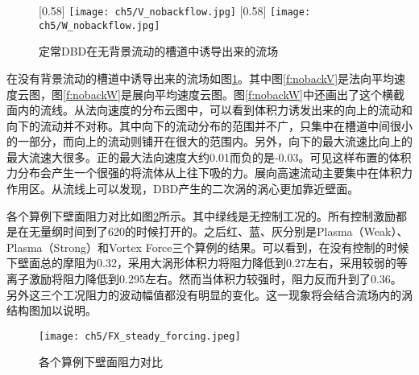 \begin{figure}[htb]
  \centering
  [0.58\textwidth]%
    {\texttt{[image: ch5/V\_nobackflow.jpg]}}%
  [0.58\textwidth]
    {\texttt{[image: ch5/W\_nobackflow.jpg]}}%
  \caption{定常DBD在无背景流动的槽道中诱导出来的流场}\label{f:nobackflow}
\end{figure}
在没有背景流动的槽道中诱导出来的流场如图\ref{f:nobackflow}。其中图\ref{f:nobackV}是法向平均速度云图，图\ref{f:nobackW}是展向平均速度云图。图\ref{f:nobackW}中还画出了这个横截面内的流线。从法向速度的分布云图中，可以看到体积力诱发出来的向上的流动和向下的流动并不对称。其中向下的流动分布的范围并不广，只集中在槽道中间很小的一部分，而向上的流动则铺开在很大的范围内。另外，向下的最大流速比向上的最大流速大很多。正的最大法向速度大约0.01而负的是-0.03。可见这样布置的体积力分布会产生一个很强的将流体从上往下吸的力。展向高速流动主要集中在体积力作用区。从流线上可以发现，DBD产生的二次涡的涡心更加靠近壁面。

各个算例下壁面阻力对比如图\ref{f:darg_steady}所示。其中绿线是无控制工况的。所有控制激励都是在无量纲时间到了620的时候打开的。之后红、蓝、灰分别是Plasma（Weak）、Plasma（Strong）和Vortex Force三个算例的结果。可以看到，在没有控制的时候下壁面总的摩阻为0.32，采用大涡形体积力将阻力降低到0.27左右，采用较弱的等离子激励将阻力降低到0.295左右。然而当体积力较强时，阻力反而升到了0.36。另外这三个工况阻力的波动幅值都没有明显的变化。这一现象将会结合流场内的涡结构图加以说明。
\begin{figure}
  \centering
  \texttt{[image: ch5/FX\_steady\_forcing.jpeg]}
  \caption{各个算例下壁面阻力对比}\label{f:darg_steady}
\end{figure}

